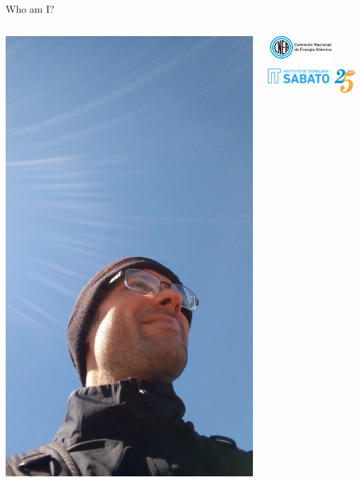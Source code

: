 \begin{frame}{Who am I?}

\begin{columns}
  
  \begin{column}{0.3\textwidth} 
\includegraphics[width=1.1\textwidth]{presentation/IMG_20180922_120515771.jpg}
    \end{column}
 
  \begin{column}{0.7\textwidth} 
  \includegraphics[height=1cm]{./presentation/ISOLOGO-CNEA-HORIZONTAL.png}
      \hspace{1cm}
      \includegraphics[height=1cm]{./presentation/logo-isabt25.png}
      \hspace{1.5cm}


\end{column}
\end{columns}
\end{frame}
